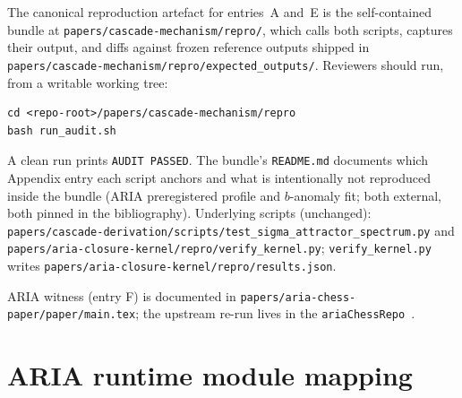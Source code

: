 \documentclass[11pt]{article}
\theoremstyle{definition}
\begin{document}
The canonical reproduction artefact for entries~A and~E is the
self-contained bundle at
\texttt{papers/cascade-mechanism/repro/}, which calls both scripts,
captures their output, and diffs against frozen reference outputs
shipped in \texttt{papers/cascade-mechanism/repro/expected\_outputs/}.
Reviewers should run, from a writable working tree:

\begin{verbatim}
cd <repo-root>/papers/cascade-mechanism/repro
bash run_audit.sh
\end{verbatim}

A clean run prints \texttt{AUDIT PASSED}. The bundle's
\texttt{README.md} documents which Appendix entry each script
anchors and what is intentionally not reproduced inside the bundle
(ARIA preregistered profile and $b$-anomaly fit; both external,
both pinned in the bibliography). Underlying scripts (unchanged):
\texttt{papers/cascade-derivation/scripts/test\_sigma\_attractor\_spectrum.py}
and \texttt{papers/aria-closure-kernel/repro/verify\_kernel.py};
\texttt{verify\_kernel.py} writes
\texttt{papers/aria-closure-kernel/repro/results.json}.

ARIA witness (entry F) is documented in
\texttt{papers/aria-chess-paper/paper/main.tex}; the upstream re-run
lives in the \texttt{ariaChessRepo}~\cite{ariaChessRepo}.

\section{ARIA runtime module mapping}\label{app:aria-runtime-map}
\end{document}

